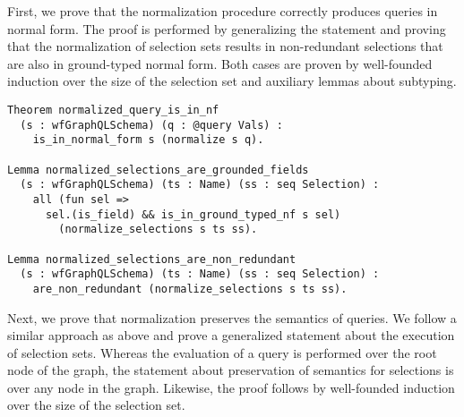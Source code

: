 First, we prove that the normalization procedure correctly produces queries in normal form. The proof is performed by generalizing the statement and proving that the normalization of selection sets results in non-redundant selections that are also in ground-typed normal form.
Both cases are proven by well-founded induction over the size of the selection set and auxiliary lemmas about subtyping. 

\begin{verbatim}
Theorem normalized_query_is_in_nf 
  (s : wfGraphQLSchema) (q : @query Vals) :
    is_in_normal_form s (normalize s q).
    
Lemma normalized_selections_are_grounded_fields 
  (s : wfGraphQLSchema) (ts : Name) (ss : seq Selection) :
    all (fun sel => 
      sel.(is_field) && is_in_ground_typed_nf s sel)
        (normalize_selections s ts ss).
 
Lemma normalized_selections_are_non_redundant 
  (s : wfGraphQLSchema) (ts : Name) (ss : seq Selection) :
    are_non_redundant (normalize_selections s ts ss).
\end{verbatim}

Next, we prove that normalization preserves the semantics of queries. We follow a similar approach as above and prove a generalized statement about the execution of selection sets. Whereas the evaluation of a query is performed over the root node of the graph, the statement about preservation of semantics for selections is over any node in the graph. 
Likewise, the proof follows by well-founded induction over the size of the selection set.


